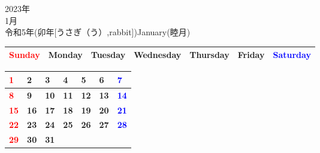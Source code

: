 \documentclass[a4paper,landscape]{jsarticle}
\newcommand{\dig}{\hspace{29mm}}
\newcommand{\tdig}{\hspace{27mm}}
\newcommand{\LBF}{\LARGE\textbf}
\begin{document}
\pagestyle{empty}

\begin{center}
	\HUGE 2023年\\
	\huge 1月\\
	\large 令和5年(卯年[うさぎ（う）,rabbit])January(睦月)
\end{center}

\begingroup
\renewcommand{\arraystretch}{1.4}
\begin{tabular}{|>{\centering\arraybackslash}p{32mm}|>{\centering\arraybackslash}p{32mm}|>{\centering\arraybackslash}p{32mm}|>{\centering\arraybackslash}p{32mm}|>{\centering\arraybackslash}p{32mm}|>{\centering\arraybackslash}p{32mm}|>{\centering\arraybackslash}p{32mm}|}
\hline
\textcolor{red}{\large Sunday}&\large Monday&\large Tuesday&\large Wednesday&\large Thursday&\large Friday&\textcolor{blue}{\large Saturday}\\
\hline
\end{tabular}
\endgroup

\begingroup
\renewcommand{\arraystretch}{4}
\begin{tabular}{|p{32mm}|p{32mm}|p{32mm}|p{32mm}|p{32mm}|p{32mm}|p{32mm}|}
\hline
\raisebox{30pt} {\dig\textcolor{red}{\LBF{1}}}&\raisebox{30pt} {\dig\LBF{2}}&\raisebox{30pt} {\dig\LBF{3}}&\raisebox{30pt} {\dig\LBF{4}}&\raisebox{30pt} {\dig\LBF{5}}&\raisebox{30pt} {\dig\LBF{6}}&\raisebox{30pt} {\dig\textcolor{blue}{\LBF{7}}}\\
\hline
\raisebox{30pt} {\dig\textcolor{red}{\LBF{8}}}&\raisebox{30pt} {\dig\LBF{9}}&\raisebox{30pt} {\tdig\LBF{10}}&\raisebox{30pt} {\tdig\LBF{11}}&\raisebox{30pt} {\tdig\LBF{12}}&\raisebox{30pt} {\tdig\LBF{13}}&\raisebox{30pt} {\tdig\textcolor{blue}{\LBF{14}}}\\
\hline
\raisebox{30pt} {\tdig\textcolor{red}{\LBF{15}}}&\raisebox{30pt} {\tdig\LBF{16}}&\raisebox{30pt} {\tdig\LBF{17}}&\raisebox{30pt} {\tdig\LBF{18}}&\raisebox{30pt} {\tdig\LBF{19}}&\raisebox{30pt} {\tdig\LBF{20}}&\raisebox{30pt} {\tdig\textcolor{blue}{\LBF{21}}}\\
\hline
\raisebox{30pt} {\tdig\textcolor{red}{\LBF{22}}}&\raisebox{30pt} {\tdig\LBF{23}}&\raisebox{30pt} {\tdig\LBF{24}}&\raisebox{30pt} {\tdig\LBF{25}}&\raisebox{30pt} {\tdig\LBF{26}}&\raisebox{30pt} {\tdig\LBF{27}}&\raisebox{30pt} {\tdig\textcolor{blue}{\LBF{28}}}\\
\hline
\raisebox{30pt} {\tdig\textcolor{red}{\LBF{29}}}&\raisebox{30pt} {\tdig\LBF{30}}&\raisebox{30pt} {\tdig\LBF{31}}&&&&\\
\hline
\end{tabular}
\endgroup
\end{document}
